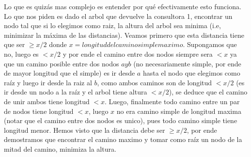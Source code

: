 \documentclass[A4paper,oneside,fleqn,11pt]{article}
\theoremstyle{definition}
\begin{document}
Lo que es quizás mas complejo es entender por qué efectivamente esto funciona. Lo que nos piden es dado el arbol que devuelve la consultora 1, encontrar un nodo tal que si lo elegimos como raiz, la altura del arbol sea minima (i.e, minimizar la máxima de las distancias). Veamos primero que esta distancia tiene que ser $\geq x/2$ donde $x = longitud del camino simple maximo$. Supongamos que no, luego es $<x/2$ y por ende el camino entre dos nodos siempre sera $<x$ ya que un camino posible entre dos nodos $a y b$ (no necesariamente simple, por ende de mayor longitud que el simple) es ir desde $a$ hasta el nodo que elegimos como raíz y luego ir desde la raiz al $b$, como ambos caminos son de longitud $<x/2$ (es ir desde un nodo a la raíz y el arbol tiene altura $<x/2$), se deduce que el camino de unir ambos tiene longitud $<x$. Luego, finalmente todo camino entre un par de nodos tiene longitud $<x$, luego $x$ no era camino simple de longitud maxima (notar que el camino entre dos nodos es unico), pues todo camino simple tiene longitud menor. Hemos visto que la distancia debe ser $\geq x/2$, por ende demostramos que encontrar el camino maximo y tomar como raíz un nodo de la mitad del camino, minimiza la altura.
\end{document}
